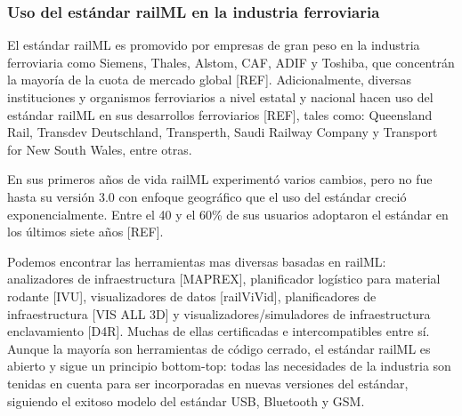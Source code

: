 \subsubsection{Uso del estándar railML en la industria ferroviaria}

    El estándar railML es promovido por empresas de gran peso en la industria ferroviaria como Siemens, Thales, Alstom, CAF, ADIF y Toshiba, que concentrán la mayoría de la cuota de mercado global [REF]. Adicionalmente, diversas instituciones y organismos ferroviarios a nivel estatal y nacional hacen uso del estándar railML en sus desarrollos ferroviarios [REF], tales como: Queensland Rail, Transdev Deutschland, Transperth, Saudi Railway Company y Transport for New South Wales, entre otras.

    En sus primeros años de vida railML experimentó varios cambios, pero no fue hasta su versión 3.0 con enfoque geográfico que el uso del estándar creció exponencialmente. Entre el 40 y el 60\% de sus usuarios adoptaron el estándar en los últimos siete años [REF].

    Podemos encontrar las herramientas mas diversas basadas en railML: analizadores de infraestructura [MAPREX], planificador logístico para material rodante [IVU], visualizadores de datos [railViVid], planificadores de infraestructura [VIS ALL 3D] y visualizadores/simuladores de infraestructura enclavamiento [D4R]. Muchas de ellas certificadas e intercompatibles entre sí. Aunque la mayoría son herramientas de código cerrado, el estándar railML es abierto y sigue un principio bottom-top: todas las necesidades de la industria son tenidas en cuenta para ser incorporadas en nuevas versiones del estándar, siguiendo el exitoso modelo del estándar USB, Bluetooth y GSM. 